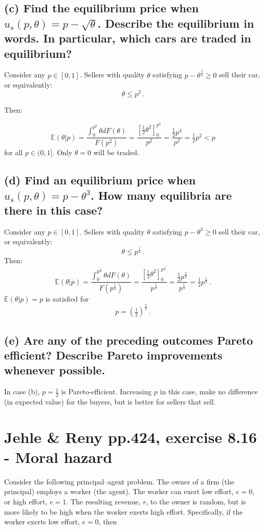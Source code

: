 \documentclass{article}
\begin{document}
\subsection*{(c) Find the equilibrium price when $u_s(p, \theta) = p - \sqrt{\theta}$. Describe the equilibrium in words. In
particular, which cars are traded in equilibrium?}

Consider any $p \in [0,1]$. Sellers with quality $\theta$ satisfying $p - \theta^\frac12 \geq 0$ sell their car, or equivalently:$$\theta \leq p^2 \, .$$

Then:

$$\mathbb{E}(\theta | p) = \frac{\int_{0}^{p^2}\theta dF(\theta)}{F(p^2)} = \frac{\left[ \tfrac12 \theta^2 \right]^{p^2}_0}{p^2} = \frac{\tfrac12 p^4}{p^2} = \tfrac12 p^2 < p$$for all $p \in (0,1]$. Only $\theta = 0$ will be traded.

\subsection*{(d) Find an equilibrium price when $u_s(p, \theta) = p - \theta^3$. How many equilibria are there in this case?  }

Consider any $p \in [0,1]$. Sellers with quality $\theta$ satisfying $p - \theta^3 \geq 0$ sell their car, or equivalently:$$\theta \leq p^{\tfrac13} \, .$$
Then:
$$\mathbb{E}(\theta | p) = \frac{\int_{0}^{p^{\frac13}}\theta dF(\theta)}{F(p^{\frac13})} = \frac{\left[ \tfrac13 \theta^2 \right]^{p^{\frac13}}_0}{p^{\frac13}} = \frac{\tfrac12 p^{\frac23}}{p^{\frac13}} = \tfrac12 p^{\frac13} \, .$$
$\mathbb{E}(\theta | p) = p$ is satisfied for$$p = \left( \tfrac12 \right)^{\tfrac32} \, .$$

\subsection*{(e) Are any of the preceding outcomes Pareto efficient? Describe Pareto improvements whenever
possible.}

In case (b), $p=\tfrac12$ is Pareto-efficient. Increasing $p$ in this case, make no difference (in expected value) for the buyers, but is better for sellers that sell.

\bigskip

\section{Jehle \& Reny pp.424, exercise 8.16 - Moral hazard}

Consider the following principal–agent problem. The owner of a firm (the principal) employs a
worker (the agent). The worker can exert low effort, $e = 0$, or high effort, $e = 1$. The resulting
revenue, $r$, to the owner is random, but is more likely to be high when the worker exerts high effort.
Specifically, if the worker exerts low effort, $e = 0$, then
\end{document}
